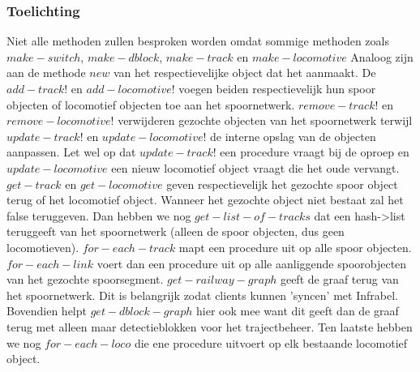 \documentclass{article}
\begin{document}
\subsubsection{Toelichting}
Niet alle methoden zullen besproken worden omdat sommige methoden zoals $make-switch$, $make-dblock$, $make-track$ en $make-locomotive$
Analoog zijn aan de methode $new$ van het respectievelijke object dat het aanmaakt. De $add-track!$ en $add-locomotive!$ voegen beiden respectievelijk hun spoor objecten of locomotief objecten
toe aan het spoornetwerk. $remove-track!$ en $remove-locomotive!$ verwijderen gezochte objecten van het spoornetwerk terwijl $update-track!$ en $update-locomotive!$ de interne opslag van de objecten aanpassen. 
Let wel op dat $update-track!$ een procedure vraagt bij de oproep en $update-locomotive$ een nieuw locomotief object vraagt die het oude vervangt. $get-track$ en $get-locomotive$ geven respectievelijk het gezochte spoor object terug of het locomotief object. Wanneer het gezochte object niet bestaat zal het false teruggeven.
Dan hebben we nog $get-list-of-tracks$ dat een hash->list teruggeeft van het spoornetwerk (alleen de spoor objecten, dus geen locomotieven). $for-each-track$ mapt een procedure uit op alle spoor objecten. $for-each-link$ voert dan een procedure uit op alle aanliggende 
spoorobjecten van het gezochte spoorsegment. $get-railway-graph$ geeft de graaf terug van het spoornetwerk. Dit is belangrijk zodat clients kunnen 'syncen' met Infrabel. Bovendien helpt $get-dblock-graph$ hier ook mee want 
dit geeft dan de graaf terug met alleen maar detectieblokken voor het trajectbeheer. Ten laatste hebben we nog $for-each-loco$ die ene procedure uitvoert op elk bestaande locomotief object.
\end{document}
